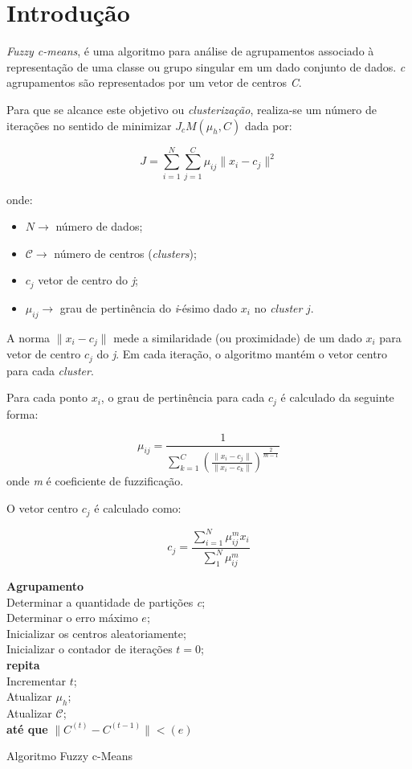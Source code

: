 \documentclass[12pt,a4paper]{article}
\numberwithin{equation}{section}
\begin{document}
\section{Introdução}

\textit{Fuzzy c-means}, é uma algoritmo para análise de agrupamentos associado à representação de uma classe ou grupo singular em um dado conjunto de dados. \textit{c} agrupamentos são representados por um vetor de centros \textit{C}.

Para que se alcance este objetivo ou \textit{clusterização}, realiza-se um número de iterações no sentido de minimizar $J_{c}M(\mu_{h},C)$ dada por:

\begin{equation}
J=\sum_{i=1}^{N}\sum_{j=1}^{C}\mu_{ij}\lVert x_{i}-c_{j} \rVert^2
\end{equation}

onde:
\begin{itemize}
	\item $N\longrightarrow$ número de dados;
	\item $\mathcal{C}\longrightarrow$ número de centros (\textit{clusters});
	\item $c_{j}$ vetor de centro do \textit{j};
	\item $\mu_{ij}\longrightarrow$ grau de pertinência do \textit{i}-ésimo dado $x_{i}$ no \textit{cluster} $j$.
\end{itemize}

A norma $\lVert x_{i}-c_{j} \rVert$ mede a similaridade (ou proximidade) de um dado $x_{i}$ para vetor de centro $c_{j}$ do \textit{j}. Em cada iteração, o algoritmo mantém o vetor centro para cada \textit{cluster}. 

Para cada ponto $x_{i}$, o grau de pertinência para cada $c_{j}$ é calculado da seguinte forma:

\begin{equation}
\mu_{ij}=\frac{1}{\sum_{k=1}^{C}(\frac{\lVert x_{i}-c_{j} \rVert}{\lVert x_{i}-c_{k} \rVert})^\frac{2}{m-1}}
\end{equation}
onde \textit{m} é coeficiente de fuzzificação.

O vetor centro $c_{j}$ é calculado como:

\begin{equation}
c_{j}=\frac{\sum_{i=1}^{N}\mu_{ij}^m x_{i}}{\sum_{1}^{N}\mu_{ij}^m}
\end{equation}
\begin{algorithm}[H]
	\textbf{Agrupamento}\\
	Determinar a quantidade de partições \textit{c}; \\
	Determinar o erro máximo $e$;\\
	Inicializar os centros aleatoriamente;\\
	Inicializar o contador de iterações $t=0$;\\
	\textbf{repita}\\
	Incrementar $t$;\\
	Atualizar $\mu_{h}$;\\
	Atualizar $\mathcal{C}$;\\
	\textbf{até que} $\lVert C^{(t)}-C^{(t-1)} \rVert$$<(e)$
	\caption{Algoritmo Fuzzy c-Means}
\end{algorithm}
\end{document}
